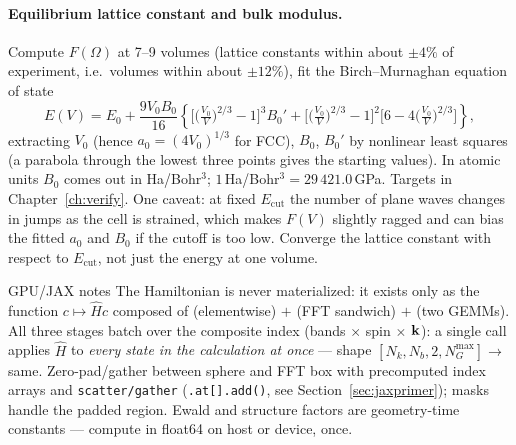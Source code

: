 \paragraph{Equilibrium lattice constant and bulk modulus.} Compute
$F(\Omega)$ at 7--9 volumes (lattice constants within about $\pm4\%$ of
experiment, i.e.\ volumes within about $\pm12\%$), fit the
Birch--Murnaghan equation of state
\begin{equation}
E(V) = E_0 + \frac{9 V_0 B_0}{16}
\left\{ \Big[\big(\tfrac{V_0}{V}\big)^{2/3} - 1\Big]^3 B_0'
+ \Big[\big(\tfrac{V_0}{V}\big)^{2/3} - 1\Big]^2
\Big[6 - 4\big(\tfrac{V_0}{V}\big)^{2/3}\Big] \right\},
\end{equation}
extracting $V_0$ (hence $a_0 = (4V_0)^{1/3}$ for FCC), $B_0$, $B_0'$ by
nonlinear least squares (a parabola through the lowest three points gives
the starting values). In atomic units $B_0$ comes out in Ha/Bohr$^3$;
$1$\,Ha/Bohr$^3 = 29\,421.0$\,GPa. Targets in
Chapter~\ref{ch:verify}. One caveat: at fixed $E_{\mathrm{cut}}$ the number
of plane waves changes in jumps as the cell is strained, which makes $F(V)$
slightly ragged and can bias the fitted $a_0$ and $B_0$ if the cutoff is too
low. Converge the lattice constant with respect to $E_{\mathrm{cut}}$, not
just the energy at one volume.

\begin{gpubox}{GPU/JAX notes}
The Hamiltonian is never materialized: it exists only as the function
$c \mapsto \hat H c$ composed of (elementwise) $+$ (FFT sandwich) $+$ (two
GEMMs). All three stages batch over the composite index (bands $\times$ spin
$\times$ $\mathbf{k}$): a single call applies $\hat H$ to \emph{every state in the
calculation at once} --- shape
$[N_k, N_b, 2, N_G^{\max}] \to$ same. Zero-pad/gather between sphere and FFT
box with precomputed index arrays and \texttt{scatter/gather} (\texttt{.at[].add()}, see Section~\ref{sec:jaxprimer});
masks handle the padded region. Ewald and structure factors are geometry-time
constants --- compute in float64 on host or device, once.
\end{gpubox}
